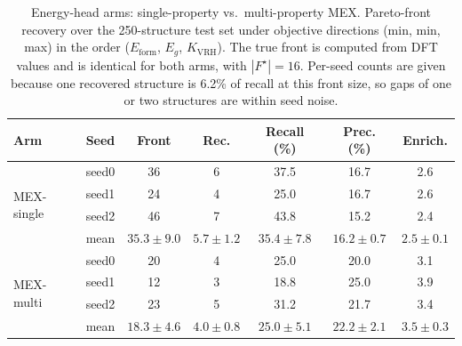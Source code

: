 \begin{table}[htbp]
\renewcommand{\arraystretch}{1.2}
\setlength{\tabcolsep}{4pt}
\caption{Energy-head arms: single-property vs.\ multi-property MEX. Pareto-front recovery over the 250-structure test set under objective directions (min, min, max) in the order ($E_\mathrm{form}$, $E_g$, $K_\mathrm{VRH}$). The true front is computed from DFT values and is identical for both arms, with $|F^\star|{=}16$. Per-seed counts are given because one recovered structure is 6.2\% of recall at this front size, so gaps of one or two structures are within seed noise.}
\label{tab:pareto_arms_mex}
\centering
\footnotesize
\begin{tabular}{@{}llccccc@{}}
\hline\hline
\textbf{Arm} & \textbf{Seed} & \textbf{Front} & \textbf{Rec.} & \textbf{Recall (\%)} & \textbf{Prec. (\%)} & \textbf{Enrich.} \\
\hline
\multirow{4}{*}{MEX-single}
  & seed0 & 36 & 6 & 37.5 & 16.7 & 2.6 \\
  & seed1 & 24 & 4 & 25.0 & 16.7 & 2.6 \\
  & seed2 & 46 & 7 & 43.8 & 15.2 & 2.4 \\
  & mean & $35.3 \pm 9.0$ & $5.7 \pm 1.2$ & $35.4 \pm 7.8$ & $16.2 \pm 0.7$ & $2.5 \pm 0.1$ \\
\hline
\multirow{4}{*}{MEX-multi}
  & seed0 & 20 & 4 & 25.0 & 20.0 & 3.1 \\
  & seed1 & 12 & 3 & 18.8 & 25.0 & 3.9 \\
  & seed2 & 23 & 5 & 31.2 & 21.7 & 3.4 \\
  & mean & $18.3 \pm 4.6$ & $4.0 \pm 0.8$ & $25.0 \pm 5.1$ & $22.2 \pm 2.1$ & $3.5 \pm 0.3$ \\
\hline\hline
\end{tabular}
\end{table}
